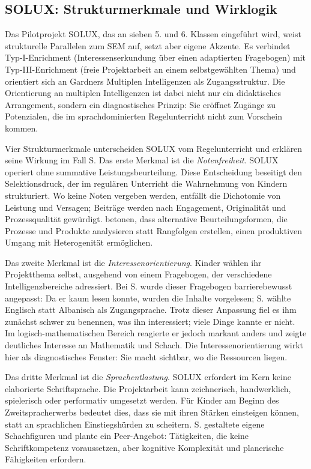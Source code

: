 \documentclass[ngerman, a4paper]{article}
\begin{document}
\subsection{SOLUX: Strukturmerkmale und Wirklogik}

Das Pilotprojekt SOLUX, das an sieben 5. und 6. Klassen eingeführt wird, weist
strukturelle Parallelen zum SEM auf, setzt aber eigene Akzente. Es verbindet
Typ-I-Enrichment (Interessenserkundung über einen adaptierten Fragebogen) mit
Typ-III-Enrichment (freie Projektarbeit an einem selbstgewählten Thema) und orientiert
sich an Gardners Multiplen Intelligenzen als Zugangsstruktur. Die Orientierung an
multiplen Intelligenzen ist dabei nicht nur ein didaktisches Arrangement, sondern ein
diagnostisches Prinzip: Sie eröffnet Zugänge zu Potenzialen, die im sprachdominierten
Regelunterricht nicht zum Vorschein kommen.

Vier Strukturmerkmale unterscheiden SOLUX vom Regelunterricht und erklären seine
Wirkung im Fall S. Das erste Merkmal ist die \textit{Notenfreiheit}. SOLUX operiert
ohne summative Leistungsbeurteilung. Diese Entscheidung beseitigt den
Selektionsdruck, der im regulären Unterricht die Wahrnehmung von Kindern strukturiert.
Wo keine Noten vergeben werden, entfällt die Dichotomie von Leistung und Versagen;
Beiträge werden nach Engagement, Originalität und Prozessqualität gewürdigt.
\textcite{buholzer2010allegleich} betonen, dass alternative Beurteilungsformen, die Prozesse
und Produkte analysieren statt Rangfolgen erstellen, einen produktiven Umgang mit
Heterogenität ermöglichen.

Das zweite Merkmal ist die \textit{Interessenorientierung}. Kinder wählen ihr
Projektthema selbst, ausgehend von einem Fragebogen, der verschiedene
Intelligenzbereiche adressiert. Bei S. wurde dieser Fragebogen barrierebewusst
angepasst: Da er kaum lesen konnte, wurden die Inhalte vorgelesen; S. wählte
Englisch statt Albanisch als Zugangsprache. Trotz dieser Anpassung fiel es ihm
zunächst schwer zu benennen, was ihn interessiert; viele Dinge kannte er nicht.
Im logisch-mathematischen Bereich reagierte er jedoch markant anders und zeigte
deutliches Interesse an Mathematik und Schach. Die Interessenorientierung wirkt
hier als diagnostisches Fenster: Sie macht sichtbar, wo die Ressourcen liegen.

Das dritte Merkmal ist die \textit{Sprachentlastung}. SOLUX erfordert im Kern keine
elaborierte Schriftsprache. Die Projektarbeit kann zeichnerisch, handwerklich,
spielerisch oder performativ umgesetzt werden. Für Kinder am Beginn des
Zweitspracherwerbs bedeutet dies, dass sie mit ihren Stärken einsteigen können,
statt an sprachlichen Einstiegshürden zu scheitern. S. gestaltete eigene
Schachfiguren und plante ein Peer-Angebot: Tätigkeiten, die keine Schriftkompetenz
voraussetzen, aber kognitive Komplexität und planerische Fähigkeiten erfordern.
\end{document}
